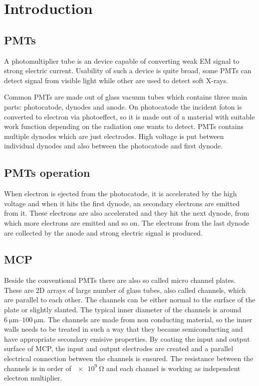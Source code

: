 \section{Introduction}

\subsection{PMTs}
A photomultiplier tube is an device capable of converting weak EM signal to strong electric current.
Usability of such a device is quite broad, some PMTs can detect signal from visible light while other
are used to detect soft X-rays.

Common PMTs are made out of glass vacuum tubes which contains three main parts: photocatode, dynodes
and anode. On photocatode the incident foton is converted to electron via photoeffect, so it is
made out of a material with suitable work function depending on the radiation one wants to detect.
PMTs contains multiple dynodes which are just electrodes. High voltage is put between individual
dynodes and also between the photocatode and first dynode.

\subsection{PMTs operation}
When electron is ejected from the photocatode, it is accelerated by the high voltage and when it
hits the first dynode, an secondary electrons are emitted from it. These electrons are also accelerated
and they hit the next dynode, from which more electrons are emitted and so on. The electrons from
the last dynode are collected by the anode and strong electric signal is produced.

\subsection{MCP}
Beside the conventional PMTs there are also so called micro channel plates. These are 2D arrays
of large number of glass tubes, also called channels, which are parallel to each other. The channels
can be either normal to the surface of the plate or slightly slanted. The typical inner diameter of
the channels is around $\SIrange{6}{100}{\micro\metre}$. The channels are made from non conducting
material, so the inner walls needs to be treated in such a way that they became semiconducting and
have appropriate secondary emisive properties. By coating the input and output surface of MCP, the
input and output electrodes are created and a parallel electrical connection between the channels
is ensured. The resistance between the channels is in order of $\SI{e9}{\ohm}$ and each channel
is working as independent electron multiplier.

